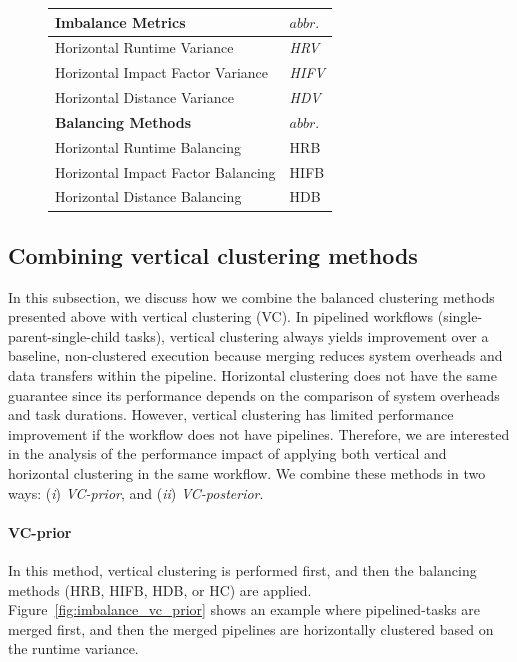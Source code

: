 \begin{figure}[htb]
	\centering
	\small
	\begin{tabular}{l|l}
		\hline
		\textbf{Imbalance Metrics} & $abbr.$   \\
		\hline
		Horizontal Runtime Variance & \emph{HRV}   \\ 
		Horizontal Impact Factor Variance & \emph{HIFV} \\ 
		Horizontal Distance Variance & \emph{HDV}  \\ 
		\hline
		\textbf{Balancing Methods} & $abbr.$  \\
		\hline
		Horizontal Runtime Balancing & HRB   \\ 
		Horizontal Impact Factor Balancing & HIFB\\ 
		Horizontal Distance Balancing & HDB \\ 
		\hline
	\end{tabular}
	\label{tab:2}
\end{figure}



\subsection{Combining vertical clustering methods}

In this subsection, we discuss how we combine the balanced clustering methods presented above with vertical clustering (VC).
In pipelined workflows (single-parent-single-child tasks), vertical clustering always yields improvement over a baseline, non-clustered execution because merging reduces system overheads and data transfers within the pipeline. Horizontal clustering does not have the same guarantee since its performance depends on the comparison of system overheads and task durations. However, vertical clustering has limited performance improvement if the workflow does not have pipelines. Therefore, we are interested in the analysis of the performance impact of applying both vertical and horizontal clustering in the same workflow. We combine these methods in two ways: (\emph{i}) \emph{VC-prior}, and (\emph{ii}) \emph{VC-posterior}.


\paragraph{\textbf{VC-prior}}
In this method, vertical clustering is performed first, and then the balancing methods (HRB, HIFB, HDB, or HC) are applied. Figure~\ref{fig:imbalance_vc_prior} shows an example where pipelined-tasks are merged first, and then the merged pipelines are horizontally clustered based on the runtime variance.

